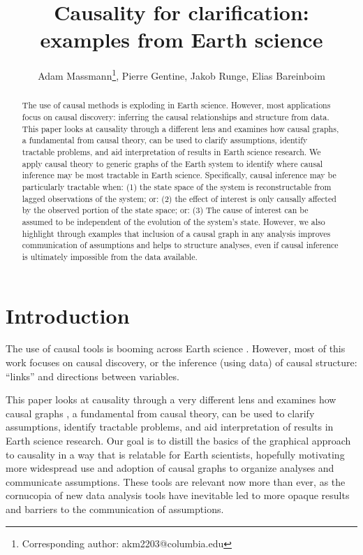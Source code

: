 \documentclass[12pt]{article}
\begin{document}
\title{Causality for clarification: examples from Earth science}

\author{Adam Massmann\thanks{Corresponding author:
    akm2203@columbia.edu}, Pierre Gentine, Jakob Runge, Elias Bareinboim}

\maketitle
\begin{abstract}
  The use of causal methods is exploding in Earth science. However,
  most applications focus on causal discovery: inferring the causal
  relationships and structure from data. This paper looks at causality
  through a different lens and examines how causal graphs, a
  fundamental from causal theory, can be used to clarify assumptions,
  identify tractable problems, and aid interpretation of results in
  Earth science research. We apply causal theory to generic graphs of
  the Earth system to identify where causal inference may be most
  tractable in Earth science. Specifically, causal inference may be
  particularly tractable when: (1) the state space of the system is
  reconstructable from lagged observations of the system; or: (2) the
  effect of interest is only causally affected by the observed portion
  of the state space; or: (3) The cause of interest can be assumed to
  be independent of the evolution of the system’s state. However, we
  also highlight through examples that inclusion of a causal graph in
  any analysis improves communication of assumptions and helps to
  structure analyses, even if causal inference is ultimately
  impossible from the data available.
\end{abstract}

\section{Introduction}

The use of causal tools is booming across Earth science
\citep[e.g.,][]{ebert-uphoff2012,
  samarasinghe-casuality,runge-causal-timeseries,runge2019inferring,goodwell-causality-2020}. However,
most of this work focuses on causal discovery, or the inference (using
data) of causal structure: ``links'' and directions between variables.

This paper looks at causality through a very different lens and
examines how causal graphs \citep{pearl1995causal}, a fundamental from
causal theory, can be used to clarify assumptions, identify tractable
problems, and aid interpretation of results in Earth science
research. Our goal is to distill \citep{olah2017} the basics of the
graphical approach to causality in a way that is relatable for Earth
scientists, hopefully motivating more widespread use and adoption of
causal graphs to organize analyses and communicate assumptions. These
tools are relevant now more than ever, as the cornucopia of new data
analysis tools have inevitable led to more opaque results and barriers
to the communication of assumptions.
\end{document}
